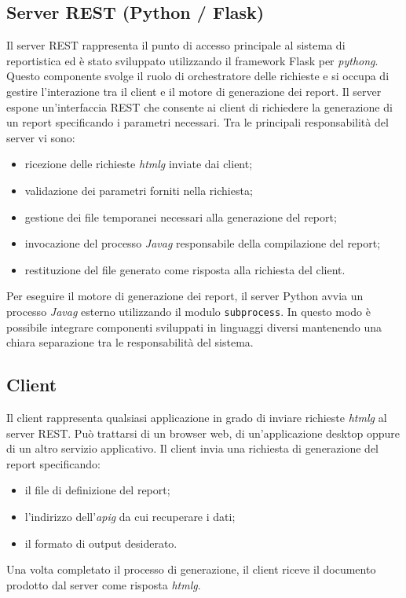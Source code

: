 \subsection{Server REST (Python / Flask)}
Il server REST rappresenta il punto di accesso principale al sistema di reportistica ed è stato sviluppato utilizzando il framework Flask per \emph{\gls{pythong}}. Questo componente svolge il ruolo di orchestratore delle richieste e si occupa di gestire l'interazione tra il client e il motore di generazione dei report.
Il server espone un'interfaccia REST che consente ai client di richiedere la generazione di un report specificando i parametri necessari. Tra le principali responsabilità del server vi sono:
\begin{itemize}
    \item ricezione delle richieste \emph{\gls{htmlg}} inviate dai client;
    \item validazione dei parametri forniti nella richiesta;
    \item gestione dei file temporanei necessari alla generazione del report;
    \item invocazione del processo \emph{\gls{Javag}} responsabile della compilazione del report;
    \item restituzione del file generato come risposta alla richiesta del client.
\end{itemize}
Per eseguire il motore di generazione dei report, il server Python avvia un processo \emph{\gls{Javag}} esterno utilizzando il modulo \texttt{subprocess}. In questo modo è possibile integrare componenti sviluppati in linguaggi diversi mantenendo una chiara separazione tra le responsabilità del sistema.

\subsection{Client}
Il client rappresenta qualsiasi applicazione in grado di inviare richieste \emph{\gls{htmlg}} al server REST. Può trattarsi di un browser web, di un'applicazione desktop oppure di un altro servizio applicativo.
Il client invia una richiesta di generazione del report specificando:
\begin{itemize}
    \item il file di definizione del report;
    \item l'indirizzo dell'\emph{\gls{apig}} da cui recuperare i dati;
    \item il formato di output desiderato.
\end{itemize}
Una volta completato il processo di generazione, il client riceve il documento prodotto dal server come risposta \emph{\gls{htmlg}}.

